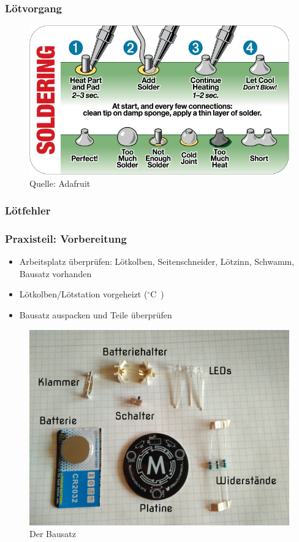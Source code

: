\documentclass[10pt]{beamer}
\begin{document}
	\begin{frame}
	\frametitle{Lötvorgang}
	\begin{figure}[hbtp]
		\centering
		\includegraphics[width=\linewidth]{images/solder.png}
		\caption{Quelle: Adafruit}
	\end{figure}
	\end{frame}

	\begin{frame}
		\frametitle{Lötfehler}
	\end{frame}

	\begin{frame}
	\frametitle{Praxisteil: Vorbereitung}
	\begin{itemize}
		\item{Arbeitsplatz überprüfen: Lötkolben, Seitenschneider, Lötzinn, Schwamm, Bausatz vorhanden}
		\item{Lötkolben/Lötstation vorgeheizt (\unit[350]{$^\circ$C})}
		\item{Bausatz auspacken und Teile überprüfen}
	\end{itemize}
	\begin{figure}[hbtp]
		\centering
		\includegraphics[width=\linewidth*5/10]{images/badge.jpg}
		\caption{Der Bausatz}
	\end{figure}
	\end{frame}
\end{document}
